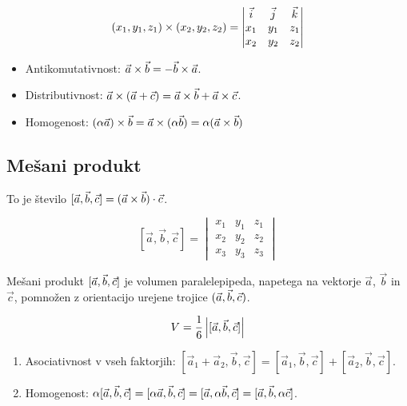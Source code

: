 
\[
	(x_1, y_1, z_1) \times (x_2, y_2, z_2) = 
	\begin{vmatrix}
		\vec{i} & \vec{j} & \vec{k} \\
		x_1 & y_1 & z_1 \\
		x_2 & y_2 & z_2
	\end{vmatrix}
\]


\begin{itemize}
	\item Antikomutativnost: $\vec{a} \times \vec{b} = - \vec{b} \times \vec{a}$.
	\item Distributivnost: $\vec{a} \times (\vec{a} + \vec{c}) = \vec{a} \times \vec{b} + \vec{a} \times \vec{c}$.
	\item Homogenost: $(\alpha \vec{a}) \times \vec{b} = \vec{a} \times (\alpha \vec{b}) = \alpha (\vec{a} \times \vec{b})$
\end{itemize}

\subsection{Mešani produkt}


To je število $[ \vec{a}, \vec{b}, \vec{c} ] = (\vec{a} \times \vec{b}) \cdot \vec{c}$.

\[
	[\vec{a}, \vec{b}, \vec{c}] = \begin{vmatrix}
		x_1 &  y_1 & z_1 \\
		x_2 & y_2 & z_2 \\
		x_3 & y_3 & z_3
	\end{vmatrix}
\]


Mešani produkt $[\vec{a}, \vec{b}, \vec{c}]$ je volumen paralelepipeda, napetega na vektorje $\vec{a}$, $\vec{b}$ in $\vec{c}$, pomnožen z orientacijo urejene trojice $(\vec{a}, \vec{b}, \vec{c})$.


\[
	V = {{1 \over 6} \left| [\vec{a}, \vec{b}, \vec{c}] \right|}
\]


\begin{enumerate}
	\item Asociativnost v vseh faktorjih: $[\vec{a}_1 + \vec{a}_2, \vec{b}, \vec{c}] = [\vec{a}_1, \vec{b}, \vec{c}] + [\vec{a}_2, \vec{b}, \vec{c}]$.
	\item Homogenost: $\alpha [\vec{a}, \vec{b}, \vec{c}] = [\alpha \vec{a}, \vec{b}, \vec{c}] = [\vec{a}, \alpha \vec{b}, \vec{c}] = [\vec{a}, \vec{b}, \alpha \vec{c}]$.
\end{enumerate}

